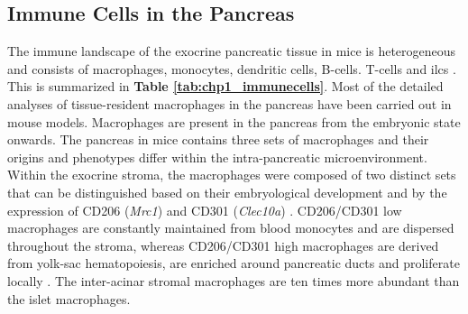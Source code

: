 \subsection{Immune Cells in the Pancreas}

The immune landscape of the exocrine pancreatic tissue in mice is heterogeneous and consists of macrophages, monocytes, dendritic cells, B-cells. T-cells and \glspl{ilc} \textbf{\cite{calderon_pancreas_2015}}. This is summarized in \textbf{Table \ref{tab:chp1_immunecells}}. Most of the detailed analyses of tissue-resident macrophages in the pancreas have been carried out in mouse models. Macrophages are present in the pancreas from the embryonic state onwards. The pancreas in mice contains three sets of macrophages and their origins and phenotypes differ within the intra-pancreatic microenvironment. Within the exocrine stroma, the macrophages were composed of two distinct sets that can be distinguished based on their embryological development and by the expression of CD206 (\textit{Mrc1}) and CD301 (\textit{Clec10a}) \textbf{\cite{calderon_pancreas_2015,cruz_macrophages_2020}}. CD206/CD301 low macrophages are constantly maintained from blood monocytes and are dispersed throughout the stroma, whereas CD206/CD301 high macrophages are derived from yolk-sac hematopoiesis, are enriched around pancreatic ducts and proliferate locally \textbf{\cite{calderon_pancreas_2015,cruz_macrophages_2020}}. The inter-acinar stromal macrophages are ten times more abundant than the islet macrophages.\\

